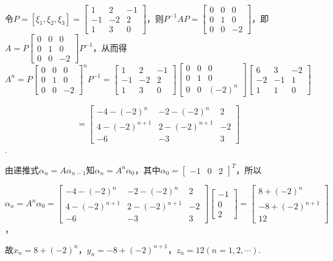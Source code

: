 \begin{solution}
    令$P=[\xi_1,\xi_2,\xi_3]=\begin{bmatrix}1&2&-1\\-1&-2&2\\1&3&0\end{bmatrix}$，则$P^{-1}AP=\begin{bmatrix}0&0&0\\0&1&0\\0&0&-2\end{bmatrix}$，即$A=P\begin{bmatrix}0&0&0\\0&1&0\\0&0&-2\end{bmatrix}P^{-1}$，从而得$A^n=P\begin{bmatrix}0&0&0\\0&1&0\\0&0&-2\end{bmatrix}^nP^{-1}=\begin{bmatrix}1&2&-1\\-1&-2&2\\1&3&0\end{bmatrix}\begin{bmatrix}0&0&0\\0&1&0\\0&0&(-2)^n\end{bmatrix}\begin{bmatrix}6&3&-2\\-2&-1&1\\1&1&0\end{bmatrix}$

    $$=\begin{bmatrix}-4-(-2)^n&-2-(-2)^n&2\\4-(-2)^{n+1}&2-(-2)^{n+1}&-2\\-6&-3&3\end{bmatrix}$$.

    由递推式$\alpha_n=A\alpha_{n-1}$知$\alpha_n=A^n\alpha_0$，其中$\alpha_0=\begin{bmatrix}-1&0&2\end{bmatrix}^T$，所以

    $\alpha_n=A^n\alpha_0=\begin{bmatrix}-4-(-2)^n&-2-(-2)^n&2\\4-(-2)^{n+1}&2-(-2)^{n+1}&-2\\-6&-3&3\end{bmatrix}\begin{bmatrix}-1\\0\\2\end{bmatrix}=\begin{bmatrix}8+(-2)^n\\-8+(-2)^{n+1}\\12\end{bmatrix}$，

    故$x_n=8+(-2)^n$，$y_n=-8+(-2)^{n+1}$，$z_n=12(n=1,2,\cdots)$.
\end{solution}


